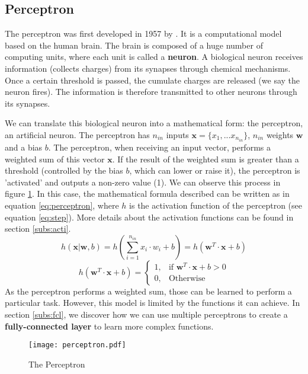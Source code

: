 \subsection{Perceptron} \label{subs:perceptron}
The perceptron was first developed in 1957 by \textcite{brain_perceptron_nodate}. It is a computational model based on the human brain. The brain is composed of a huge number of computing units, where each unit is called a \textbf{neuron}. A biological neuron receives information (collects charges) from its synapses through chemical mechanisms. Once a certain threshold is passed, the cumulate charges are released (we say the neuron fires). The information is therefore transmitted to other neurons through its synapses.

We can translate this biological neuron into a mathematical form: the perceptron, an artificial neuron. The perceptron has $n_{in}$ inputs $\boldsymbol{x} = \{ x_1, ... x_{n_{in}} \}$, $n_{in}$ weights $\boldsymbol{w}$ and a bias $b$. The perceptron, when receiving an input vector, performs a weighted sum of this vector $\boldsymbol{x}$. If the result of the weighted sum is greater than a threshold (controlled by the bias $b$, which can lower or raise it), the perceptron is 'activated' and outputs a non-zero value (1). We can observe this process in figure \ref{fig:perceptron}.
In this case, the mathematical formula described can be written as in equation \ref{eq:perceptron}, where $h$ is the activation function of the perceptron (see equation \ref{eq:step}). More details about the activation functions can be found in section \ref{subs:acti}.
%
\begin{equation}
    h ( \boldsymbol{x} | \boldsymbol{w}, b) = h(\sum^{n_{in}}_{i=1} x_i \cdot w_i + b) = h ( \boldsymbol{w}^{T} \cdot \boldsymbol{x} + b)
    \label{eq:perceptron}
\end{equation}
%
\begin{equation}
    h ( \boldsymbol{w}^{T} \cdot \boldsymbol{x} + b) = \begin{cases} 1, & \mbox{if } \boldsymbol{w}^{T} \cdot \boldsymbol{x} + b > 0 \\ 0, & \mbox{Otherwise} \end{cases}
    \label{eq:step}
\end{equation}
%
As the perceptron performs a weighted sum, those can be learned to perform a particular task. However, this model is limited by the functions it can achieve. In section \ref{subs:fcl}, we discover how we can use multiple perceptrons to create a \textbf{fully-connected layer} to learn more complex functions.
%
\begin{figure}
    \centering
    \texttt{[image: perceptron.pdf]}
    \caption{The Perceptron}
    \label{fig:perceptron}
\end{figure}
